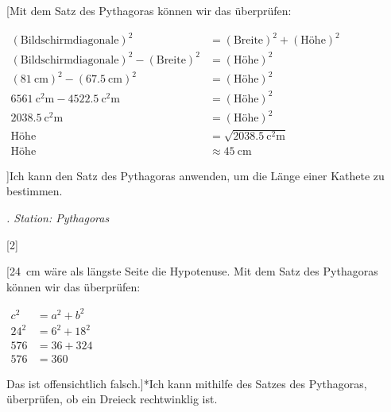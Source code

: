 \documentclass[
paper=a4,
fontsize=12pt,
headings=small,
parskip=half,
draft=false
]{scrartcl}
\newcounter{magicrownumbers}
\begin{document}
\pagestyle{empty}
\pagestyle{scrheadings}

\tabulinesep=6pt
\renewcommand{\arraystretch}{1.8}


[Mit dem Satz des Pythagoras können wir das überprüfen:
\begin{minipage}{\tabucolX}
	\centering
	$\begin{aligned}
	(\text{Bildschirmdiagonale})^2 &= (\text{Breite})^2 + (\text{Höhe})^2 \\
	(\text{Bildschirmdiagonale})^2 - (\text{Breite})^2 &= (\text{Höhe})^2 \\
	(\SI{81}{\centi\m})^2 - (\SI{67,5}{\centi\m})^2 &= (\text{Höhe})^2 \\
	\SI{6561}{\square\centi\m} - \SI{4522,5}{\square\centi\m} &= (\text{Höhe})^2 \\
	\SI{2038,5}{\square\centi\m} &= (\text{Höhe})^2 \\
	\text{Höhe} &= \sqrt{\SI{2038,5}{\square\centi\m}} \\ 
	\text{Höhe} &\approx \SI{45}{\centi\m}
	\end{aligned}$
\end{minipage}]{Ich kann den Satz des Pythagoras anwenden, um die Länge einer Kathete zu bestimmen.}{\item \textit{. Station: Pythagoras}}[2]

[\SI{24}{\centi\m} wäre als längste Seite die Hypotenuse. Mit dem Satz des Pythagoras können wir das überprüfen:
	\begin{minipage}{\tabucolX}
		\centering
		$\begin{aligned}
			c^2 &= a^2 + b^2 \\
			24^2 &= 6^2 + 18^2 \\
			576 &= 36 + 324 \\
			576 &= 360
		\end{aligned}$
	\end{minipage}
	Das ist offensichtlich falsch.]*{Ich kann mithilfe des Satzes des Pythagoras, überprüfen, ob ein Dreieck rechtwinklig ist.}{}
\end{document}
